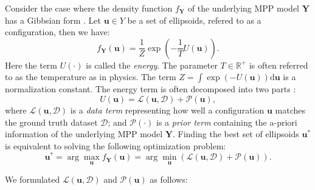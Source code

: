 \documentclass[journal]{IEEEtran}
\newcommand{\dd}[1]{\mathrm{d}#1}%
\begin{document}
Consider the case where the density function $f_{\mathbf{Y}}$ of the
underlying MPP model $\mathbf{Y}$ has a Gibbsian form
\cite{moller2007modern}. Let $\mathbf{u} \in Y$ be a set of
ellipsoids, refered to as a configuration, then we have:
\begin{equation}
  \label{eq:gibbs-density}
  f_{\mathbf{Y}}(\mathbf{u}) = \frac{1}{Z} \exp \left( - \frac{1}{T}
    U(\mathbf{u}) \right).
\end{equation}
Here the term $U(\cdot)$ is called the \textit{energy}. The parameter
$T \in \mathbb{R}^{+}$ is often referred to as the temperature as in
physics. The term
$Z = \int \exp \left( -U(\mathbf{u}) \right) \dd \mathbf{u}$ is a
normalization constant. The energy term is often decomposed into two
parts \cite{lafarge2010geometric} \cite{descombes2009object}:
\begin{equation}
  \label{mpp-energy}
  U(\mathbf{u}) = \mathcal{L}(\mathbf{u}, \mathcal{D})
  + \mathcal{P} (\mathbf{u}),
\end{equation}
where $\mathcal{L}(\mathbf{u}, \mathcal{D})$ is a \textit {data term}
representing how well a configuration $\mathbf{u}$ matches the ground
truth dataset $\mathcal{D}$; and $\mathcal{P} (\cdot)$ is a \textit
{prior term} containing the a-priori information of the underlying MPP
model $\mathbf{Y}$. Finding the best set of ellipsoids
$\mathbf{u}^{*}$ is equivalent to solving the following optimization
problem:
\begin{equation}
  \label{mpp-opt-energy}
  \mathbf{u}^{*}
  = \arg \max_{\mathbf{u}}{f_{\mathbf{Y}}(\mathbf{u})}
  = \arg\min_ {\mathbf{u}} \left( \mathcal{L}(\mathbf{u},
    \mathcal{D}) + \mathcal{P} (\mathbf{u}) \right).
\end{equation}

We formulated $\mathcal{L}(\mathbf{u}, \mathcal{D})$ and
$\mathcal{P} (\mathbf{u})$ as follows:
\end{document}
